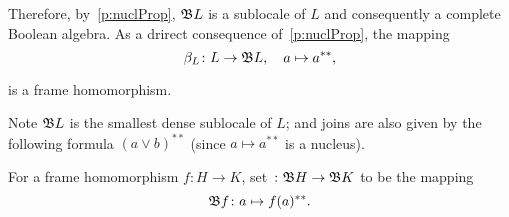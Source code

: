     Therefore, by~\ref{p:nuclProp}, $\mathfrak{B} L$ is a sublocale of $L$ and consequently a complete Boolean algebra. As a drirect consequence of~\ref{p:nuclProp}, the mapping
    $$\text{\DEFSYM{BetaL}{$\beta_L$}}\colon L \to \Bo L,\quad a \mapsto a^{**},$$

    is a frame homomorphism.

\begin{block}{Note}
    $\mathfrak{B} L$ is the smallest dense sublocale of $L$; and joins are also given by the following formula $(a \vee b)^{**}$ (since $a \mapsto a^{**}$ is a nucleus).
\end{block}


\begin{definition}\label{d:BooleanizationMorph}
    For a frame homomorphism $f\colon H \to K$, set $\colon \mathfrak{B} H \to \mathfrak{B} K$ to be the mapping
    $$\mathfrak{B} f\colon a \mapsto f(a)^{**}.$$
\end{definition}

